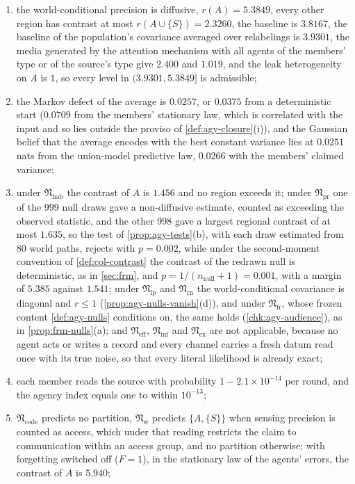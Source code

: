 \begin{observation}
\begin{enumerate}
\item[(a)] the world-conditional precision is diffusive, $r(A)=5.3849$, every other region has contrast at most $r(A\cup\{S\})=2.3260$, the baseline is $3.8167$, the baseline of the population's covariance averaged over relabelings is $3.9301$, the media generated by the attention mechanism with all agents of the members' type or of the source's type give $2.400$ and $1.019$, and the leak heterogeneity on $A$ is $1$, so every level in $(3.9301,5.3849]$ is admissible;
\item[(b)] the Markov defect of the average is $0.0257$, or $0.0375$ from a deterministic start ($0.0709$ from the members' stationary law, which is correlated with the input and so lies outside the proviso of \cref{def:agy-closure}(i)), and the Gaussian belief that the average encodes with the best constant variance lies at $0.0251$ nats from the union-model predictive law, $0.0266$ with the members' claimed variance;
\item[(c)] under $\mathfrak N_{\mathrm{hab}}$ the contrast of $A$ is $1.456$ and no region exceeds it; under $\mathfrak N_{\mathrm{pr}}$ one of the 999 null draws gave a non-diffusive estimate, counted as exceeding the observed statistic, and the other 998 gave a largest regional contrast of at most $1.635$, so the test of \cref{prop:agy-tests}(b), with each draw estimated from 80 world paths, rejects with $p=0.002$, while under the second-moment convention of \cref{def:col-contrast} the contrast of the redrawn null is deterministic, as in \cref{sec:frm}, and $p=1/(n_{\mathrm{null}}+1)=0.001$, with a margin of $5.385$ against $1.541$; under $\mathfrak N_{\mathrm{lp}}$ and $\mathfrak N_{\mathrm{rn}}$ the world-conditional covariance is diagonal and $r\le1$ (\cref{prop:agy-nulls-vanish}(d)), and under $\mathfrak N_{\mathrm{fr}}$, whose frozen content \cref{def:agy-nulls} conditions on, the same holds (\cref{chk:agy-audience}), as in \cref{prop:frm-nulls}(a); and $\mathfrak N_{\mathrm{eff}}$, $\mathfrak N_{\mathrm{inf}}$ and $\mathfrak N_{\mathrm{ex}}$ are not applicable, because no agent acts or writes a record and every channel carries a fresh datum read once with its true noise, so that every literal likelihood is already exact;
\item[(d)] each member reads the source with probability $1-2.1\times10^{-14}$ per round, and the agency index equals one to within $10^{-13}$;
\item[(e)] $\mathfrak N_{\mathrm{code}}$ predicts no partition, $\mathfrak N_{\mathrm w}$ predicts $\{A,\{S\}\}$ when sensing precision is counted as access, which under that reading restricts the claim to communication within an access group, and no partition otherwise; with forgetting switched off ($F=1$), in the stationary law of the agents' errors, the contrast of $A$ is $5.940$;

\end{enumerate}
\end{observation}
